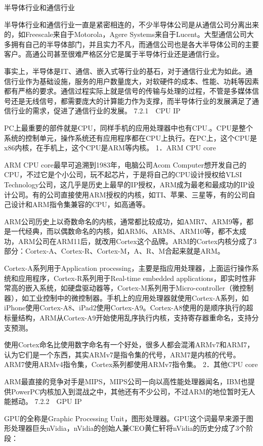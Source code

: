 \documentclass[12pt,UTF8]{ctexbook}
\begin{document}
半导体行业和通信行业

半导体行业和通信行业一直是紧密相连的，不少半导体公司是从通信公司分离出来的，如Freescale来自于Motorola，Agere Systems来自于Lucent。大型通信公司大多拥有自己的半导体部门，并且实力不凡，而通信公司也是各大半导体公司的主要客户。高通公司甚至很难严格区分它是属于半导体行业还是通信行业。

事实上，半导体是IT、通信、嵌入式等行业的基石，对于通信行业尤为如此。通信行业作为基础设施，服务的用户数量庞大，对软硬件的成本、性能、功耗等因素都有严格的要求。通信过程实际上就是信号的传输与处理的过程，不管是多媒体信号还是无线信号，都需要庞大的计算能力作为支撑，而半导体行业的发展满足了通信行业的需求，促进了通信行业的发展。
7.2.1　CPU IP

PC上最重要的部件就是CPU，同样手机的应用处理器中也有CPU.。CPU是整个系统的控制单元，操作系统还有应用程序都在CPU上执行。在PC上，这个CPU是x86内核，在手机上，这个CPU是ARM等内核。
1．ARM CPU core

ARM CPU core最早可追溯到1983年，电脑公司Acom Computer想开发自己的CPU，不过它是个小公司，玩不起芯片，于是将自己的CPU设计授权给VLSI Technology公司，这几乎是历史上最早的IP授权，ARM成为最老和最成功的IP设计公司。有的公司直接使用ARM授权的内核，如TI、苹果、三星等，有的公司自己设计和ARM指令集兼容的CPU，如高通等。

ARM公司历史上以奇数命名的内核，通常都比较成功，如AMR7、ARM9等，都是一代经典，而以偶数命名的内核，如ARM6、ARM8、ARM10等，都不太成功，ARM公司在ARM11后，就改用Cortex这个品牌。ARM的Cortex内核分成了3部分：Cortex-A、Cortex-R、Cortex-M，A、R、M合起来就是ARM。

Cortex-A系列用于Application processing，主要是指应用处理器，上面运行操作系统和应用程序，Cortex-R系列用于Real-time embedded applications，即实时性非常高的嵌入系统，如硬盘驱动器等，Cortex-M系列用于Micro-controller（微控制器），如工业控制中的微控制器。手机上的应用处理器就使用Cortex-A系列，如iPhone使用Cortex-A8、iPad2使用Cortex-A9。Cortex-A8使用的是顺序执行的超标量结构，ARM从Cortex-A9开始使用乱序执行内核，支持寄存器重命名，支持分支预测。

使用Cortex命名比使用数字命名有一个好处，很多人都会混淆ARMv7和ARM7，认为它们是一个东西，其实ARMv7是指令集的代号，ARM7是内核的代号。ARM7使用ARMv4指令集，Cortex系列都使用ARMv7指令集。
2．其他CPU core

ARM最直接的竞争对手是MIPS，MIPS公司一向以高性能处理器闻名，IBM也提供PowerPC内核加入到混战之中，其他还有不少公司，不过ARM的地位暂时无人能撼动。
7.2.2　GPU IP

GPU的全称是Graphic Processing Unit，图形处理器。GPU这个词最早来源于图形处理器巨头nVidia，nVidia的创始人兼CEO黄仁轩将nVidia的历史分成了3个阶段：
\end{document}
